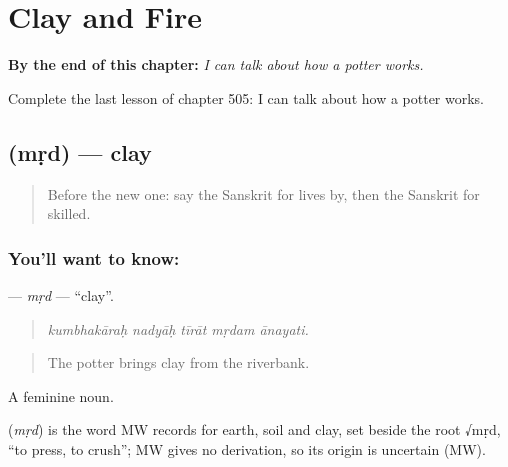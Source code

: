 
\chapter{Clay and Fire}
\label{ch:sa-clay-and-fire}

\begin{chapteropening}
\textbf{By the end of this chapter:} \emph{I can talk about how a potter works.}

Complete the last lesson of chapter 505: I can talk about how a potter works.
\end{chapteropening}

\section[\texorpdfstring{\sk{मृद्} (mṛd)}{मृद् (mṛd)}]{ (mṛd) — clay}

\label{lesson:SA-C505-mrd}



\begin{quote}
Before the new one: say the Sanskrit for lives by, then the Sanskrit for skilled.
\end{quote}

\subsection*{You'll want to know: }
\textbf{} — \emph{mṛd} — \textquotedblleft{}clay\textquotedblright{}.

\begin{quote}
    
\end{quote}

\begin{quote}
\emph{kumbhakāraḥ nadyāḥ tīrāt mṛdam ānayati.}
\end{quote}

\begin{quote}
The potter brings clay from the riverbank.
\end{quote}

A feminine noun.

\begin{cousinweb}
\textbf{} (\emph{mṛd}) is the word MW records for earth, soil and clay, set beside the root √mṛd, \textquotedblleft{}to press, to crush\textquotedblright{}; MW gives no derivation, so its origin is uncertain (MW).
\end{cousinweb}


